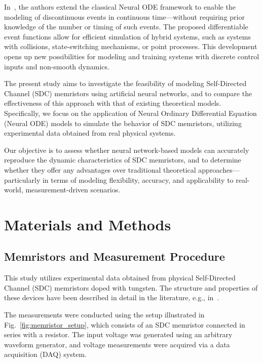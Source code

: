 \documentclass[11pt, oneside]{article}
\begin{document}
In~\cite{Ricky2021}, the authors extend the classical Neural ODE framework to enable the modeling of discontinuous events in continuous time—without requiring prior knowledge of the number or timing of such events. The proposed differentiable event functions allow for efficient simulation of hybrid systems, such as systems with collisions, state-switching mechanisms, or point processes. This development opens up new possibilities for modeling and training systems with discrete control inputs and non-smooth dynamics.


The present study aims to investigate the feasibility of modeling Self-Directed Channel (SDC) memristors using artificial neural networks, and to compare the effectiveness of this approach with that of existing theoretical models. Specifically, we focus on the application of Neural Ordinary Differential Equation (Neural ODE) models to simulate the behavior of SDC memristors, utilizing experimental data obtained from real physical systems.

Our objective is to assess whether neural network-based models can accurately reproduce the dynamic characteristics of SDC memristors, and to determine whether they offer any advantages over traditional theoretical approaches—particularly in terms of modeling flexibility, accuracy, and applicability to real-world, measurement-driven scenarios.

\section{Materials and Methods}


\subsection{Memristors and Measurement Procedure}

This study utilizes experimental data obtained from physical Self-Directed Channel (SDC) memristors doped with tungsten. The structure and properties of these devices have been described in detail in the literature, e.g., in~\cite{Garda2024, Campbell2017}.

The measurements were conducted using the setup illustrated in Fig.~\ref{fig:memristor_setup}, which consists of an SDC memristor connected in series with a resistor. The input voltage was generated using an arbitrary waveform generator, and voltage measurements were acquired via a data acquisition (DAQ) system.
\end{document}
